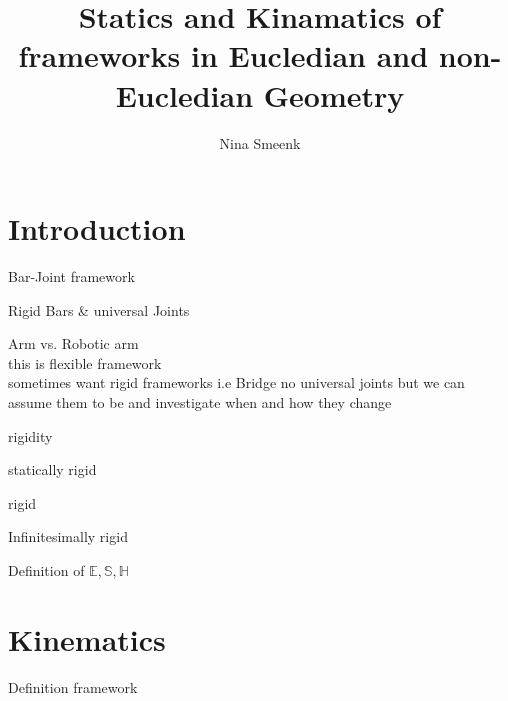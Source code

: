 \documentclass[titlepage]{article}
\begin{document}
\author{Nina Smeenk }
\title{Statics and Kinamatics of frameworks in Eucledian and non-Eucledian Geometry}
\maketitle

\section{Introduction}
\begin{compactitem}
	\item Bar-Joint framework
	\item Rigid Bars \& universal Joints
	\item Arm vs. Robotic arm \\
	this is flexible framework \\
	sometimes want rigid frameworks i.e Bridge
	no universal joints but we can assume them to be and investigate when and how they change
	
	\item rigidity
	\begin{compactitem}[$\circ$]
		\item statically rigid
		\item rigid
		\item Infinitesimally rigid
	\end{compactitem}
	\item Definition of $\mathbb{E,S,H}$
\end{compactitem}

\newpage
\section{Kinematics}
\begin{compactenum}
	\item Definition framework
\end{compactenum}
\end{document}
